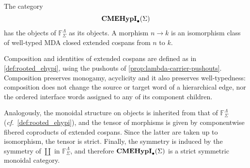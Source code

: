 \begin{definition}
\label{def:lambda-extended-cospan-category}
The category
\[
  \mathbf{CMEHypI}_{\bullet}(\Sigma)
\]
has the objects of \(\mathbb F^\Lambda_\Sigma\) as its objects. A
morphism \(n\to k\) is an isomorphism class of well-typed MDA closed
extended cospans from \(n\) to \(k\).

Composition and identities  of extended cospans are
defined as in
\cref{def:rooted_ehypi}, using the pushouts of
\cref{prop:lambda-carrier-pushouts}. 
Composition preserves monogamy, acyclicity and it also preserves well-typedness: composition
does not change the source or target word of a hierarchical edge, nor
the ordered interface words assigned to any of its component children.

Analogously, the monoidal structure on objects is inherited from that of $\mathbb{F}^{\Lambda}_{\Sigma}$ (\textit{cf.}~\cref{def:rooted_ehypi}), and the tensor of morphisms is given by componentwise fibered coproducts of extended cospans.
Since the latter are taken up to isomorphism, the tensor is strict.
Finally, the symmetry is induced by the symmetry of $\coprod$ in $\mathbb{F}^{\Lambda}_{\Sigma}$, and therefore
\(\mathbf{CMEHypI}_{\bullet}(\Sigma)\) is a strict symmetric monoidal
category.
\end{definition}

